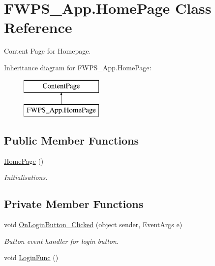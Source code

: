 \hypertarget{class_f_w_p_s___app_1_1_home_page}{}\section{F\+W\+P\+S\+\_\+\+App.\+Home\+Page Class Reference}
\label{class_f_w_p_s___app_1_1_home_page}


Content Page for Homepage.  


Inheritance diagram for F\+W\+P\+S\+\_\+\+App.\+Home\+Page\+:\begin{figure}[H]
\begin{center}
\leavevmode
\includegraphics[height=2.000000cm]{class_f_w_p_s___app_1_1_home_page}
\end{center}
\end{figure}
\subsection*{Public Member Functions}
\begin{DoxyCompactItemize}
\item 
\mbox{\hyperlink{class_f_w_p_s___app_1_1_home_page_ad71b37dbb11335bf9f6d131f60d09064}{Home\+Page}} ()
\begin{DoxyCompactList}\small\item\em Initialisations. \end{DoxyCompactList}\end{DoxyCompactItemize}
\subsection*{Private Member Functions}
\begin{DoxyCompactItemize}
\item 
void \mbox{\hyperlink{class_f_w_p_s___app_1_1_home_page_a3f1ba9f8247e776351e28d08fc575533}{On\+Login\+Button\+\_\+\+Clicked}} (object sender, Event\+Args e)
\begin{DoxyCompactList}\small\item\em Button event handler for login button. \end{DoxyCompactList}\item 
void \mbox{\hyperlink{class_f_w_p_s___app_1_1_home_page_a7a387157af98a0948b4df8bbd95173f0}{Login\+Func}} ()
\end{DoxyCompactItemize}

